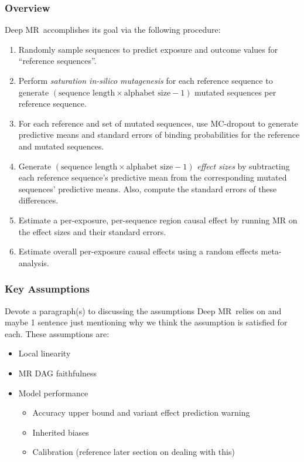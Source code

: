 \documentclass[twoside,11pt]{article}
\newcommand{\method}{{Deep MR}}
\begin{document}
\subsubsection{Overview}%
\method\ accomplishes its goal via the following procedure: 
\label{ssub:algo_overview}
\begin{enumerate}
    \item Randomly sample sequences to predict exposure and outcome values for ``reference sequences''.
    \item Perform \textit{saturation in-silico mutagenesis} for each reference sequence to generate \( (\text{sequence\ length} \times \text{alphabet\ size} - 1) \) mutated sequences per reference sequence.
    \item For each reference and set of mutated sequences, use MC-dropout \cite{gal2016dropout} to generate predictive means and standard errors of binding probabilities for the reference and mutated sequences.
    \item Generate \( (\text{sequence length} \times \text{alphabet size} - 1) \) \textit{effect sizes} by subtracting each reference sequence's predictive mean from the corresponding mutated sequences' predictive means. Also, compute the standard errors of these differences.
    \item Estimate a per-exposure, per-sequence region causal effect by running MR on the effect sizes and their standard errors.
    \item Estimate overall per-exposure causal effects using a random effects meta-analysis.
\end{enumerate}

\subsubsection{Key Assumptions}%
\label{ssub:key_assumptions}
Devote a paragraph(s) to discussing the assumptions \method\ relies on and maybe 1 sentence just mentioning why we think the assumption is satisfied for each. These assumptions are:
\begin{itemize}
	\item Local linearity
	\item MR DAG faithfulness
	\item Model performance
		\begin{itemize}
			\item Accuracy upper bound and variant effect prediction warning
			\item Inherited biases
			\item Calibration (reference later section on dealing with this)
		\end{itemize}
\end{itemize}
\end{document}
